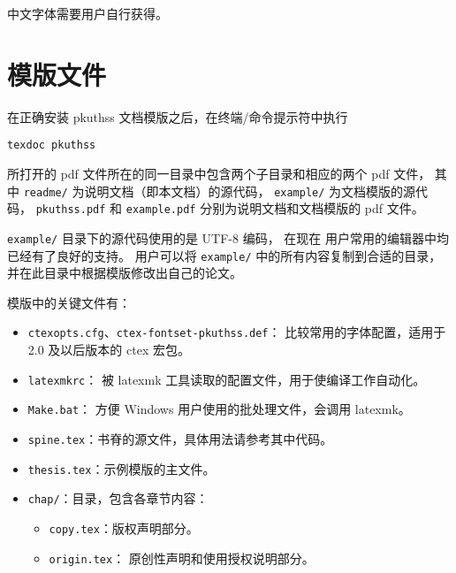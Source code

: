 中文字体需要用户自行获得。

\section{模版文件}\label{sec:doc-dir}

在正确安装 pkuthss 文档模版之后，在终端/命令提示符中执行
\begin{Verbatim}
texdoc pkuthss
\end{Verbatim}
所打开的 pdf 文件所在的同一目录中包含两个子目录和相应的两个 pdf 文件，
其中 \verb|readme/| 为说明文档（即本文档）的源代码，%
\verb|example/| 为文档模版的源代码，%
\verb|pkuthss.pdf| 和 \verb|example.pdf|
分别为说明文档和文档模版的 pdf 文件。

\verb|example/| 目录下的源代码使用的是 UTF-8 编码，
在现在  用户常用的编辑器中均已经有了良好的支持。
用户可以将 \verb|example/| 中的所有内容复制到合适的目录，
并在此目录中根据模版修改出自己的论文。


模版中的关键文件有：
\begin{itemize}
	\item \verb|ctexopts.cfg|、\verb|ctex-fontset-pkuthss.def|：
		比较常用的字体配置，适用于 2.0 及以后版本的
		ctex 宏包。
	\item \verb|latexmkrc|：
		被 latexmk 工具读取的配置文件，用于使编译工作自动化。
	\item \verb|Make.bat|：%
		方便 Windows 用户使用的批处理文件，会调用 latexmk。
	\item \verb|spine.tex|：书脊的源文件，具体用法请参考其中代码。
	\item \verb|thesis.tex|：示例模版的主文件。

	\item \verb|chap/|：目录，包含各章节内容：
	\begin{itemize}
		\item \verb|copy.tex|：版权声明部分。
		\item \verb|origin.tex|：
			原创性声明和使用授权说明部分。
	\end{itemize}
\end{itemize}

